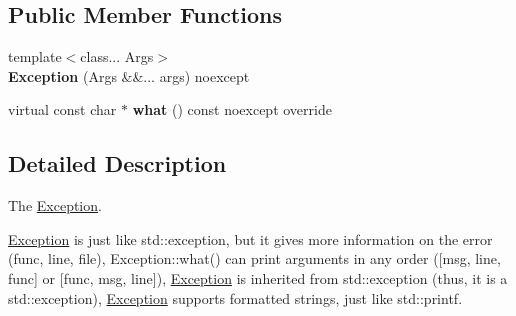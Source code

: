 \subsection*{Public Member Functions}
\begin{DoxyCompactItemize}
\item 
\mbox{\label{class_va_exc_1_1_exception_af13faa3d0a78c38c70252255aaf926ec}} 
{\footnotesize template$<$class... Args$>$ }\\{\bfseries Exception} (Args \&\&... args) noexcept
\item 
\mbox{\label{class_va_exc_1_1_exception_a43f332b702c6e9812f37193b8512bb62}} 
virtual const char $\ast$ {\bfseries what} () const noexcept override
\end{DoxyCompactItemize}


\subsection{Detailed Description}
The \hyperlink{class_va_exc_1_1_exception}{Exception}. 

\hyperlink{class_va_exc_1_1_exception}{Exception} is just like std\+::exception, but it gives more information on the error (func, line, file), Exception\+::what() can print arguments in any order (\mbox{[}msg, line, func\mbox{]} or \mbox{[}func, msg, line\mbox{]}), \hyperlink{class_va_exc_1_1_exception}{Exception} is inherited from std\+::exception (thus, it is a std\+::exception), \hyperlink{class_va_exc_1_1_exception}{Exception} supports formatted strings, just like std\+::printf.

